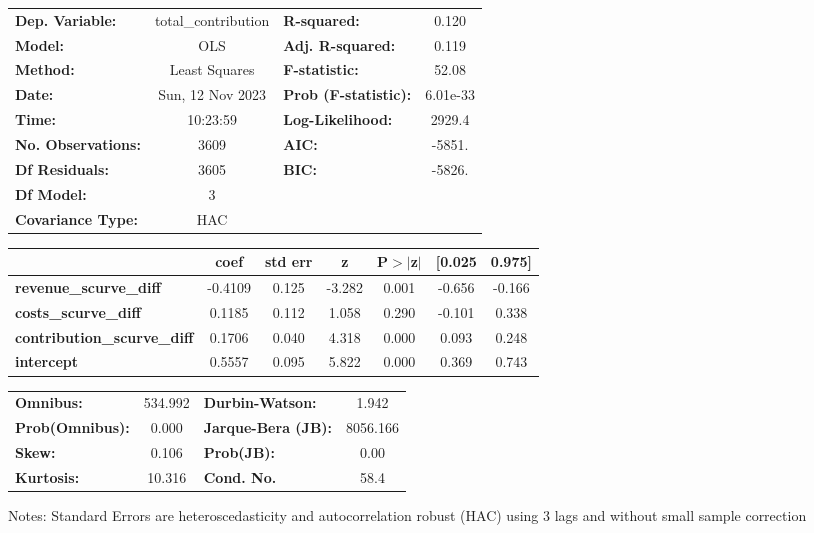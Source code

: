 \begin{center}
\begin{tabular}{lclc}
\toprule
\textbf{Dep. Variable:}             & total\_contribution & \textbf{  R-squared:         } &     0.120   \\
\textbf{Model:}                     &         OLS         & \textbf{  Adj. R-squared:    } &     0.119   \\
\textbf{Method:}                    &    Least Squares    & \textbf{  F-statistic:       } &     52.08   \\
\textbf{Date:}                      &   Sun, 12 Nov 2023  & \textbf{  Prob (F-statistic):} &  6.01e-33   \\
\textbf{Time:}                      &       10:23:59      & \textbf{  Log-Likelihood:    } &    2929.4   \\
\textbf{No. Observations:}          &          3609       & \textbf{  AIC:               } &    -5851.   \\
\textbf{Df Residuals:}              &          3605       & \textbf{  BIC:               } &    -5826.   \\
\textbf{Df Model:}                  &             3       & \textbf{                     } &             \\
\textbf{Covariance Type:}           &         HAC         & \textbf{                     } &             \\
\bottomrule
\end{tabular}
\begin{tabular}{lcccccc}
                                    & \textbf{coef} & \textbf{std err} & \textbf{z} & \textbf{P$> |$z$|$} & \textbf{[0.025} & \textbf{0.975]}  \\
\midrule
\textbf{revenue\_scurve\_diff}      &      -0.4109  &        0.125     &    -3.282  &         0.001        &       -0.656    &       -0.166     \\
\textbf{costs\_scurve\_diff}        &       0.1185  &        0.112     &     1.058  &         0.290        &       -0.101    &        0.338     \\
\textbf{contribution\_scurve\_diff} &       0.1706  &        0.040     &     4.318  &         0.000        &        0.093    &        0.248     \\
\textbf{intercept}                  &       0.5557  &        0.095     &     5.822  &         0.000        &        0.369    &        0.743     \\
\bottomrule
\end{tabular}
\begin{tabular}{lclc}
\textbf{Omnibus:}       & 534.992 & \textbf{  Durbin-Watson:     } &    1.942  \\
\textbf{Prob(Omnibus):} &   0.000 & \textbf{  Jarque-Bera (JB):  } & 8056.166  \\
\textbf{Skew:}          &   0.106 & \textbf{  Prob(JB):          } &     0.00  \\
\textbf{Kurtosis:}      &  10.316 & \textbf{  Cond. No.          } &     58.4  \\
\bottomrule
\end{tabular}
\end{center}

Notes: \newline
 [1] Standard Errors are heteroscedasticity and autocorrelation robust (HAC) using 3 lags and without small sample correction